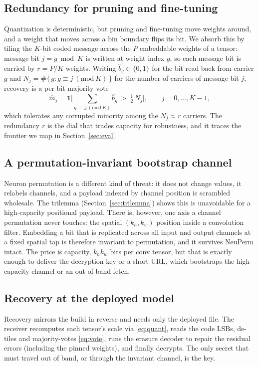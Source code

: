 \documentclass[a4paper,fleqn]{cas-dc}
\theoremstyle{plain}
\theoremstyle{remark}
\begin{document}
\subsection{Redundancy for pruning and fine-tuning}\label{sec:redund}
Quantization is deterministic, but pruning and fine-tuning move weights around, and a
weight that moves across a bin boundary flips its bit. We absorb this by tiling the
$K$-bit coded message across the $P$ embeddable weights of a tensor: message bit
$j=g\bmod K$ is written at weight index $g$, so each message bit is carried by $r=P/K$
weights. Writing $\hat b_g\in\{0,1\}$ for the bit read back from carrier $g$ and
$N_j=\#\{\,g : g\equiv j\ (\mathrm{mod}\ K)\,\}$ for the number of carriers of message
bit $j$, recovery is a per-bit majority vote
\begin{equation}\label{eq:vote}
\hat m_j=\mathbf 1\!\Big[\textstyle\sum_{g\,\equiv\, j\ (\mathrm{mod}\ K)} \hat b_g
\ >\ \tfrac12\,N_j\Big],\qquad j=0,\dots,K-1,
\end{equation}
which tolerates any corrupted minority among the $N_j\approx r$ carriers. The redundancy
$r$ is the dial that trades capacity for robustness, and it traces the frontier we map in
Section~\ref{sec:eval}.

\subsection{A permutation-invariant bootstrap channel}
Neuron permutation is a different kind of threat: it does not change values, it
relabels channels, and a payload indexed by channel position is scrambled wholesale.
The trilemma (Section~\ref{sec:trilemma}) shows this is unavoidable for a high-capacity
positional payload. There is, however, one axis a channel permutation never touches:
the spatial $(k_h,k_w)$ position inside a convolution filter. Embedding a bit that is
replicated across all input and output channels at a fixed spatial tap is therefore
invariant to permutation, and it survives NeuPerm intact. The price is capacity,
$k_h k_w$ bits per conv tensor, but that is exactly enough to deliver the decryption
key or a short URL, which bootstraps the high-capacity channel or an out-of-band fetch.

\subsection{Recovery at the deployed model}
Recovery mirrors the build in reverse and needs only the deployed file. The receiver
recomputes each tensor's scale via \eqref{eq:quant}, reads the code LSBs, de-tiles and
majority-votes \eqref{eq:vote}, runs the erasure decoder to repair the residual errors
(including the pinned weights), and finally decrypts. The only secret that must travel
out of band, or through the invariant channel, is the key.
\end{document}
